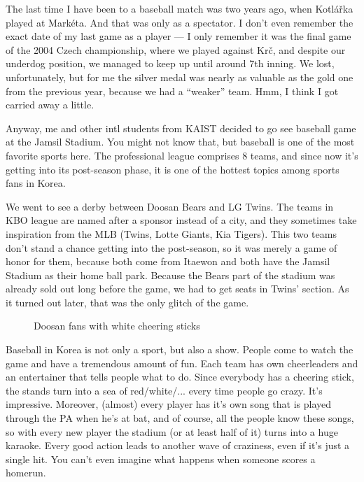 \begin{post}
	\begin{content}
The last time I have been to a baseball match was two years ago, when Kotlářka played at Markéta. And that was only as a spectator. I don't even remember the exact date of my last game as a player --- I only remember it was the final game of the 2004 Czech championship, where we played against Krč, and despite our underdog position, we managed to keep up until around 7th inning. We lost, unfortunately, but for me the silver medal was nearly as valuable as the gold one from the previous year, because we had a ``weaker'' team. Hmm, I think I got carried away a little.

Anyway, me and other intl students from KAIST decided to go see baseball game at the Jamsil Stadium. You might not know that, but baseball is one of the most favorite sports here. The professional league comprises 8 teams, and since now it's getting into its post-season phase, it is one of the hottest topics among sports fans in Korea.

We went to see a derby between Doosan Bears and LG Twins. The teams in KBO league are named after a sponsor instead of a city, and they sometimes take inspiration from the MLB (Twins, Lotte Giants, Kia Tigers). This two teams don't stand a chance getting into the post-season, so it was merely a game of honor for them, because both come from Itaewon and both have the Jamsil Stadium as their home ball park. Because the Bears part of the stadium was already sold out long before the game, we had to get seats in Twins' section. As it turned out later, that was the only glitch of the game.

\begin{figure}
\centering
{}
\caption{Doosan fans with white cheering sticks}
\vspace{-24pt}
\end{figure}

Baseball in Korea is not only a sport, but also a show. People come to watch the game and have a tremendous amount of fun. Each team has own cheerleaders and an entertainer that tells people what to do. Since everybody has a cheering stick, the stands turn into a sea of red/white/... every time people go crazy. It's impressive. Moreover, (almost) every player has it's own song that is played through the PA when he's at bat, and of course, all the people know these songs, so with every new player the stadium (or at least half of it) turns into a huge karaoke. Every good action leads to another wave of craziness, even if it's just a single hit. You can't even imagine what happens when someone scores a homerun.


\end{content}
\end{post}
